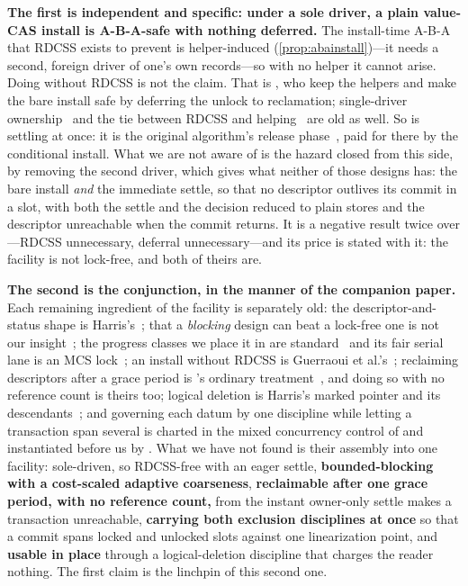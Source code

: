 \documentclass[11pt]{article}
\begin{document}
\textbf{The first is independent and specific: under a sole driver, a plain
value-CAS install is A-B-A-safe with nothing deferred.} The install-time A-B-A
that RDCSS exists to prevent is helper-induced
(\cref{prop:abainstall})---it needs a second, foreign driver of one's own
records---so with no helper it cannot arise. Doing without RDCSS is not the
claim. That is \citet{guerraoui2020mcas}, who keep the helpers and make the
bare install safe by deferring the unlock to reclamation; single-driver
ownership~\citep{israeli1994disjoint} and the tie between RDCSS and
helping~\citep{fraser2004lockfreedom, guerraoui2020mcas, brown2022pathcas} are
old as well. So is settling at once: it is the original algorithm's release
phase~\citep{harris2002mcas, fraser2004lockfreedom}, paid for there by the
conditional install. What we are
not aware of is the hazard closed from this side, by removing the second
driver, which gives what neither of those designs has: the bare install
\emph{and} the immediate settle, so that no descriptor outlives its commit in a
slot, with both the settle and the decision reduced to plain stores and the
descriptor unreachable when the commit returns. It is a negative result twice
over---RDCSS unnecessary, deferral unnecessary---and its price is stated with
it: the facility is not lock-free, and both of theirs are.

\textbf{The second is the conjunction, in the manner of the companion paper.} Each
remaining ingredient of the facility is separately old: the descriptor-and-status
shape is Harris's~\citep{harris2002mcas, fraser2004lockfreedom}; that a
\emph{blocking} design can beat a lock-free one is not our
insight~\citep{david2013everything, hendler2010flatcombining}; the progress
classes we place it in are standard~\citep{herlihy2003obstruction,
herlihy2011progress} and its fair serial lane is an MCS
lock~\citep{mellorcrummey1991mcs}; an install without RDCSS is Guerraoui et
al.'s~\citep{guerraoui2020mcas}; reclaiming descriptors after a grace period is
\rcu's ordinary treatment~\citep{arbelraviv2017descriptors}, and doing so with
no reference count is theirs too; logical deletion
is Harris's marked pointer and its descendants~\citep{harris2001lists,
ellen2010nbbst, brown2013scx}; and governing each datum by one discipline while
letting a transaction span several is charted in the mixed concurrency control of
\citet{tang2018cormcc} and instantiated before us by \citet{wang2016mocc}. What
we have not found is their assembly into one
facility: sole-driven, so RDCSS-free with an eager settle, \textbf{bounded-blocking
with a cost-scaled
adaptive coarseness}, \textbf{reclaimable after one grace period, with no
reference count,} from the instant owner-only
settle makes a transaction unreachable, \textbf{carrying both exclusion
disciplines at once} so that a commit spans locked and unlocked slots against one
linearization point, and \textbf{usable in place} through a
logical-deletion discipline that charges the reader nothing. The first claim is
the linchpin of this second one.
\end{document}
